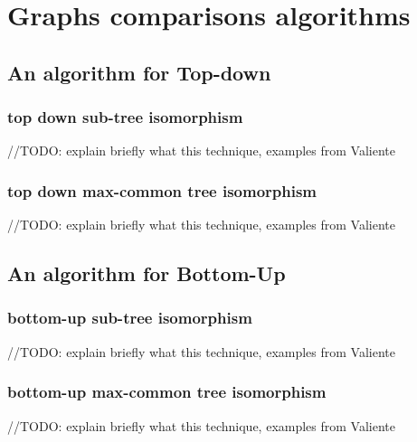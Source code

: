 \chapter{Graphs comparisons algorithms}
\label{cha:Algorithms}

\section{An algorithm for Top-down }
\label{sec:topdown}
\subsection{top down sub-tree isomorphism}
//TODO: explain briefly what this technique, examples from Valiente
\subsection{top down max-common tree isomorphism}
//TODO: explain briefly what this technique, examples from Valiente
\section{An algorithm for Bottom-Up}

\subsection{bottom-up sub-tree isomorphism}
//TODO: explain briefly what this technique, examples from Valiente
\subsection{bottom-up max-common tree isomorphism}
//TODO: explain briefly what this technique, examples from Valiente